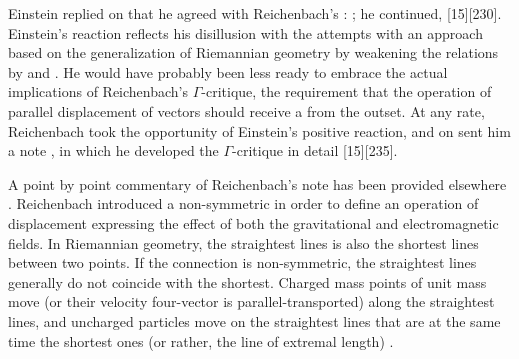 \documentclass[draft]{article}
\begin{document}
Einstein replied on   that he agreed with Reichenbach's : ;  he continued,  [15][230]. Einstein's reaction reflects his disillusion with the attempts with an approach based on the generalization of Riemannian geometry by weakening the relations by \gmn and \Gtmn. He would have probably been less ready to embrace the actual implications of Reichenbach's $\Gamma$-critique, the requirement that the operation of parallel displacement of vectors should receive a  from the outset. At any rate, Reichenbach took the opportunity of Einstein's positive reaction, and on  sent him a note \citep{Reichenbach1926f},  in which he developed the $\Gamma$-critique in detail [15][235].


A point by point commentary of Reichenbach's note has been provided elsewhere \citep{Giovanelli2016d}. Reichenbach introduced a non-symmetric \Gtmn in order to define an operation of displacement  expressing the effect of both the gravitational and electromagnetic fields. In Riemannian geometry, the straightest lines is also the shortest lines between two points. If the connection is non-symmetric, the straightest lines generally do not coincide with the shortest. Charged mass points of unit mass move (or their velocity four-vector is parallel-transported) along the straightest lines, and uncharged particles move on the straightest lines that are at the same time the shortest ones (or rather, the line of extremal length) \citep{Reichenbach1926f}.
\end{document}
